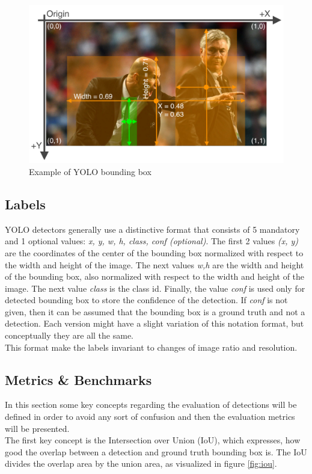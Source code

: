 \begin{figure}[!h]
  \includegraphics[width=\textwidth]{images/yolo_images/yolo_labels_zidane}
  \centering
  \caption{Example of YOLO bounding box \cite{yolov5_train_custom}}
\end{figure}

\subsection{Labels}
YOLO detectors generally use a distinctive format that consists of 5 mandatory and 1 optional values: \textit{x, y, w, h, class, conf (optional)}. The first 2 values \textit{(x, y)} are the coordinates of the center of the bounding box normalized with respect to the width and height of the image. The next values \textit{w,h} are the width and height of the bounding box, also normalized with respect to the width and height of the image. The next value \textit{class} is the class id. Finally, the value \textit{conf} is used only for detected bounding box to store the confidence of the detection. If \textit{conf} is not given, then it can be assumed that the bounding box is a ground truth and not a detection. Each version might have a slight variation of this notation format, but conceptually they are all the same. \\
This format make the labels invariant to changes of image ratio and resolution.

\subsection{Metrics \& Benchmarks}
In this section some key concepts regarding the evaluation of detections will be defined in order to avoid any sort of confusion and then the evaluation metrics will be presented. \\
The first key concept is the Intersection over Union (IoU), which expresses, how good the overlap between a detection and ground truth bounding box is. The IoU divides the overlap area by the union area, as visualized in figure \ref{fig:iou}.

